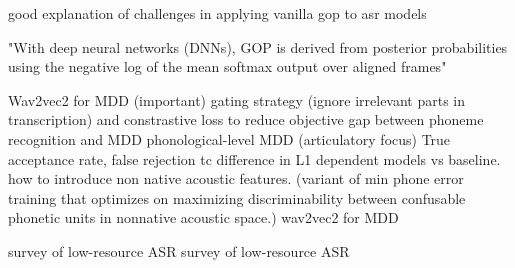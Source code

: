 \documentclass[thesis]{cluu}
\begin{document}
\parencite{caoSegmentationfreeGoodnessPronunciation2025} good explanation of challenges in applying vanilla gop to asr models

"With deep neural networks (DNNs), GOP is derived from posterior probabilities using the negative log of the mean softmax output over aligned frames" \parencite{parikhEvaluatingLogitBasedGOP2025}

\textcite{pengStudyFineTuningWav2vec202021} Wav2vec2 for MDD (important)
\textcite{pengTextAwareEndtoendMispronunciation2022} gating strategy (ignore irrelevant parts in transcription) and constrastive loss to reduce objective gap between phoneme recognition and MDD
\textcite{shahinPhonologicalLevelMispronunciationDetection2024} phonological-level MDD (articulatory focus) True acceptance rate, false rejection tc
\textcite{stanleyImprovingL1specificPhonological2012} difference in L1 dependent models vs baseline. how to introduce non native acoustic features. (variant of min phone error training that optimizes on maximizing discriminability between confusable phonetic units in nonnative acoustic space.)
\textcite{xuExploreWav2vec202021} wav2vec2 for MDD

\parencite{barteldsMakingMoreLittle2023} survey of low-resource ASR
\parencite{besacierAutomaticSpeechRecognition2014} survey of low-resource ASR
\end{document}
